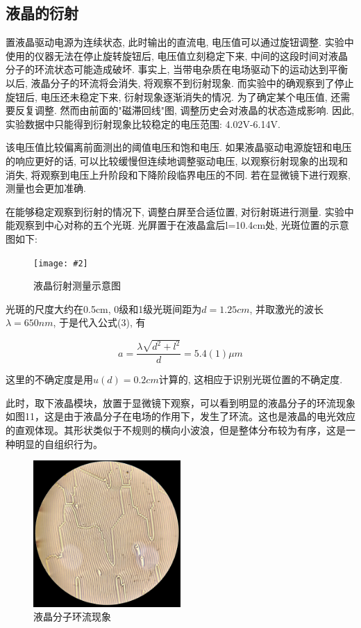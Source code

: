 \documentclass[12pt,a4paper]{article}
\newcommand{\be}[1]{
    \begin{equation}
        #1
    \end{equation}
}
\newcommand{\bfig}[3]{
    \begin{figure}[H]
        \centering
        \texttt{[image: \#2]}
        \caption{#3}
    \end{figure}
}
\begin{document}
\subsection{液晶的衍射}
置液晶驱动电源为连续状态, 此时输出的直流电, 电压值可以通过旋钮调整. 实验中使用的仪器无法在停止旋转旋钮后, 电压值立刻稳定下来, 中间的这段时间对液晶分子的环流状态可能造成破坏. 事实上, 当带电杂质在电场驱动下的运动达到平衡以后, 液晶分子的环流将会消失, 将观察不到衍射现象. 
而实验中的确观察到了停止旋钮后, 电压还未稳定下来, 衍射现象逐渐消失的情况. 为了确定某个电压值, 还需要反复调整. 然而由前面的"磁滞回线"图, 调整历史会对液晶的状态造成影响. 因此, 实验数据中只能得到衍射现象比较稳定的电压范围: 4.02V-6.14V. 

该电压值比较偏离前面测出的阈值电压和饱和电压. 如果液晶驱动电源旋钮和电压的响应更好的话, 可以比较缓慢但连续地调整驱动电压, 以观察衍射现象的出现和消失, 将观察到电压上升阶段和下降阶段临界电压的不同. 若在显微镜下进行观察, 测量也会更加准确. 

在能够稳定观察到衍射的情况下, 调整白屏至合适位置, 对衍射斑进行测量. 实验中能观察到中心对称的五个光斑. 光屏置于在液晶盒后l=10.4cm处, 光斑位置的示意图如下: 
\bfig{0.5}{液晶衍射示意图.jpg}{液晶衍射测量示意图}
光斑的尺度大约在0.5cm, 0级和1级光斑间距为$d=1.25cm$, 并取激光的波长$\lambda=650nm$, 于是代入公式(3), 有
\be{a=\frac{\lambda \sqrt{d^2+l^2}}{d}=5.4(1)\mu m}
这里的不确定度是用$u(d)=0.2cm$计算的, 这相应于识别光斑位置的不确定度. 

此时，取下液晶模块，放置于显微镜下观察，可以看到明显的液晶分子的环流现象如图11，这是由于液晶分子在电场的作用下，发生了环流。这也是液晶的电光效应的直观体现。其形状类似于不规则的横向小波浪，但是整体分布较为有序，这是一种明显的自组织行为。

\begin{figure}\label{fig:液晶环流}
    \centering
    \includegraphics[width=0.5\textwidth]{MicroScope.jpg}
    \caption{液晶分子环流现象}
\end{figure}
\end{document}

